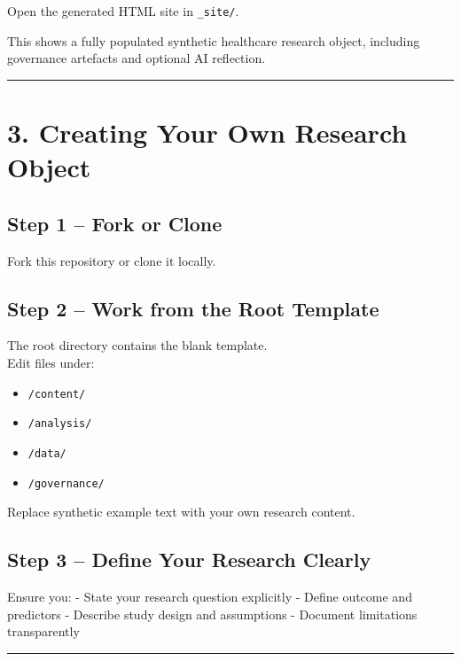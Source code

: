 \documentclass[
]{report}
\providecommand{\tightlist}{%
  \setlength{\itemsep}{0pt}\setlength{\parskip}{0pt}}
\begin{document}
Open the generated HTML site in \texttt{\_site/}.

This shows a fully populated synthetic healthcare research object,
including governance artefacts and optional AI reflection.

\begin{center}\rule{0.5\linewidth}{0.5pt}\end{center}

\section{3. Creating Your Own Research
Object}\label{creating-your-own-research-object}

\subsection{Step 1 -- Fork or Clone}\label{step-1-fork-or-clone}

Fork this repository or clone it locally.

\subsection{Step 2 -- Work from the Root
Template}\label{step-2-work-from-the-root-template}

The root directory contains the blank template.\\
Edit files under:

\begin{itemize}
\tightlist
\item
  \texttt{/content/}
\item
  \texttt{/analysis/}
\item
  \texttt{/data/}
\item
  \texttt{/governance/}
\end{itemize}

Replace synthetic example text with your own research content.

\subsection{Step 3 -- Define Your Research
Clearly}\label{step-3-define-your-research-clearly}

Ensure you: - State your research question explicitly - Define outcome
and predictors - Describe study design and assumptions - Document
limitations transparently

\begin{center}\rule{0.5\linewidth}{0.5pt}\end{center}
\end{document}
